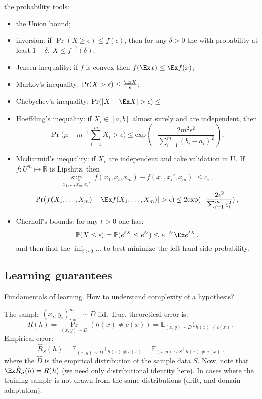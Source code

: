 \documentclass[a4paper]{article}
\newcommand{\Real}{\mathbb{R}}
\newcommand{\ex}{\mathbb{E}}
\newcommand{\pr}{\mathbb{P}}
\begin{document}
the probability tools: \begin{itemize}
	\item the Union bound;
	\item inversion: if $\Pr(X\geq \epsilon) \leq f(\epsilon)$, then for any $\delta>0$ the 
	with probability at least $1-\delta$, $X\leq f^{-1}(\delta)$;
	\item Jensen inequality: if $f$ is convex then $f(\Ex x) \leq \Ex f(x)$;
	\item Markov's inequality: $\Pr(X>\epsilon) \leq \frac{\Ex X}{\epsilon}$;
	\item Chebychev's inequality: $\Pr(|X-\Ex X| > \epsilon) \leq $
	\item Hoeffding's inequality: if $X_i\in[a,b]$ almost surely and are independent,
	then 
	\[ \Pr\bigl(\mu - m^{-1} \sum_{i=1}^m X_i > \epsilon \bigr)
		\leq \text{exp}(-\frac{2m^2\epsilon^2}{\sum_{i=1}^m(b_i-a_i)^2}) \,, \]
	\item Mcdiarmid's inequality: if $X_i$ are independent and take validation in U.
	If $f:U^m \mapsto \Real$ is Lipshitz, then
	\[ \sup_{x_1, \ldots, x_m, x_i'} |f(x_1, x_i, x_m) - f(x_1, x_i', x_m) | \leq c_i\,, \]
	\[ \Pr\bigl( f(X_1, \ldots, X_m) - \Ex f(X_1, \ldots, X_m) | > \epsilon)
		\leq 2 \text{exp}(-\frac{2 \epsilon^2}{\sum_{i=1}^m c_i^2}) \,, \]
	\item Chernoff's bounds: for any $t> 0$ one has:
	\[ \pr(X\leq \epsilon) = \pr(e^{tX} \leq e^{t\epsilon}) \leq e^{-t\epsilon}\Ex e^{tX} \,, \]
	and then find the $\inf_{t>0}\ldots$ to best minimize the left-hand side probability.
\end{itemize}


\subsection{Learning guarantees} %
\label{sub:learning_guarantees}
Fundamentals of learning. How to understand complexity of a hypothesis?

The sample $(x_i, y_i)_{i=1}^m \sim D$ iid. True, theoretical error is:
\[ R(h) = \Pr_{(x, y)\sim D} (h(x)\neq c(x)) = \ex_{(x, y)\sim D} 1_{h(x)\neq c(x)} \,, \]
Empirical error:
\[ \hat{R}_S(h)
	= \ex_{(x, y)\sim \hat{D}} 1_{h(x)\neq c(x)}
	= \ex_{(x, y)\sim S} 1_{h(x)\neq c(x)} \,,
\]
where the $\hat{D}$ is the empirical distribution of the sample data $S$. Now, note
that $\Ex \hat{R}_S(h) = R(h)$ (we need only distributional identity here). In cases
where the training sample is not drawn from the same distributions (drift, and domain
adaptation).
\end{document}
